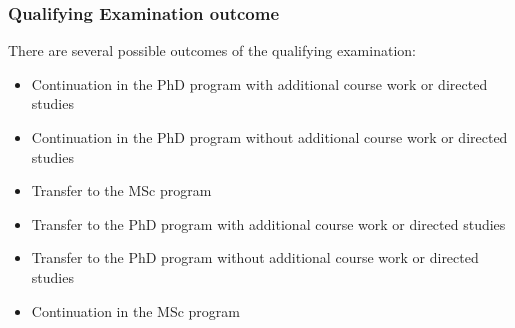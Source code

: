 \subsubsection{Qualifying Examination outcome}

\cp
\p There are several possible outcomes of the qualifying examination:

\begin{itemize}

\item Continuation in the PhD program with additional course work or directed studies
\item Continuation in the PhD program without additional course work or directed studies
\item Transfer to the MSc program
\item Transfer to the PhD program with additional course work or directed studies
\item Transfer to the PhD program without additional course work or directed studies
\item Continuation in the MSc program

\end{itemize}
